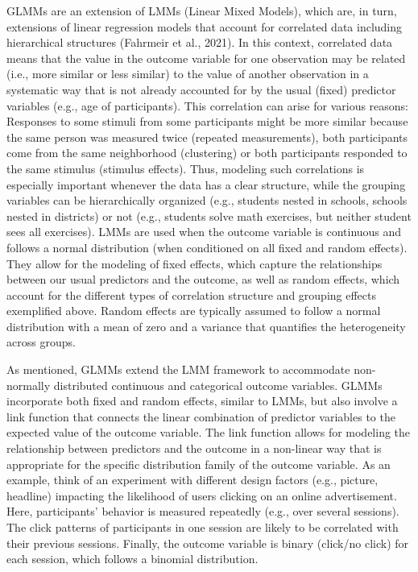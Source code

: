 \documentclass[
  man,floatsintext]{apa6}
\begin{document}
GLMMs are an extension of LMMs (Linear Mixed Models), which are, in turn, extensions of linear regression models that account for correlated data including hierarchical structures (Fahrmeir et al., 2021).
In this context, correlated data means that the value in the outcome variable for one observation may be related (i.e., more similar or less similar) to the value of another observation in a systematic way that is not already accounted for by the usual (fixed) predictor variables (e.g., age of participants).
This correlation can arise for various reasons: Responses to some stimuli from some participants might be more similar because the same person was measured twice (repeated measurements), both participants come from the same neighborhood (clustering) or both participants responded to the same stimulus (stimulus effects).
Thus, modeling such correlations is especially important whenever the data has a clear structure, while the grouping variables can be hierarchically organized (e.g., students nested in schools, schools nested in districts) or not (e.g., students solve math exercises, but neither student sees all exercises).
LMMs are used when the outcome variable is continuous and follows a normal distribution (when conditioned on all fixed and random effects).
They allow for the modeling of fixed effects, which capture the relationships between our usual predictors and the outcome, as well as random effects, which account for the different types of correlation structure and grouping effects exemplified above.
Random effects are typically assumed to follow a normal distribution with a mean of zero and a variance that quantifies the heterogeneity across groups.

As mentioned, GLMMs extend the LMM framework to accommodate non-normally distributed continuous and categorical outcome variables.
GLMMs incorporate both fixed and random effects, similar to LMMs, but also involve a link function that connects the linear combination of predictor variables to the expected value of the outcome variable.
The link function allows for modeling the relationship between predictors and the outcome in a non-linear way that is appropriate for the specific distribution family of the outcome variable.
As an example, think of an experiment with different design factors (e.g., picture, headline) impacting the likelihood of users clicking on an online advertisement.
Here, participants' behavior is measured repeatedly (e.g., over several sessions).
The click patterns of participants in one session are likely to be correlated with their previous sessions.
Finally, the outcome variable is binary (click/no click) for each session, which follows a binomial distribution.
\end{document}
